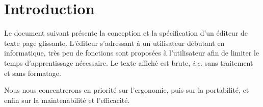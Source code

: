\vspace*{\fill}
\part{Introduction}
Le document suivant présente la conception et la spécification d'un éditeur de texte page glissante. L'éditeur s'adressant à un utilisateur débutant en informatique, très peu de fonctions sont proposées à l'utilisateur afin de limiter le temps d'apprentissage nécessaire. Le texte affiché est brute, \textsl{i.e.} sans traitement et sans formatage.

Nous nous concentrerons en priorité sur l'ergonomie, puis sur la portabilité, et enfin sur la maintenabilité et l'efficacité.
\vspace*{\fill}
